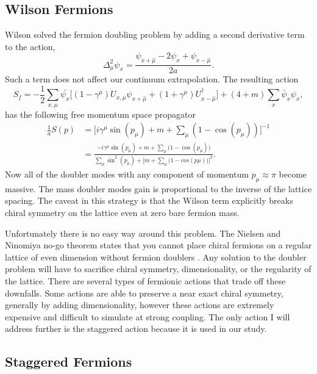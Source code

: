 \subsection{Wilson Fermions}
Wilson solved the fermion doubling problem by adding a second derivative term to the action,
\begin{equation}
  \Delta_\mu^2\psi_x=\frac{\psi_{x+\hat{\mu}}-2\psi_x+\psi_{x-\hat{\mu}}}{2a}.
\end{equation}
Such a term does not affect our continuum extrapolation.
The resulting action
\begin{equation}
  S_f=-\frac{1}{2}\sum_{x,\mu}\bar{\psi_x}\Big[(1-\gamma^\mu)U_{x,\mu}\psi_{x+\hat{\mu}}+(1+\gamma^\mu)U^\dagger_{x-\hat{\mu}}\Big]+(4+m)\sum_x\bar{\psi}_x\psi_x,
\end{equation}
has the following free momentum space propagator
\begin{equation}
  \begin{aligned}
    \frac{1}{a}S(p)&=\Big[i\gamma^\mu\sin(p_\mu)+m+\sum_\mu(1-\cos(p_\mu))\Big]^{-1}  \\
                   &=\frac{-i\gamma^\mu\sin(p_\mu)+m+\sum_\mu\big(1-\cos(p_\mu)\big)}{\sum_\mu\sin^2(p_\mu)+\Big[m+\sum_\mu\big(1-cos(p\mu)\big)\Big]^2}.
  \end{aligned}
\end{equation}
Now all of the doubler modes with any component of momentum $p_\mu\approx\pi$ become massive.
The mass doubler modes gain is proportional to the inverse of the lattice spacing.
The caveat in this strategy is that the Wilson term explicitly breaks chiral symmetry on the lattice even at zero bare fermion mass.

Unfortunately there is no easy way around this problem.
The Nielsen and Ninomiya no-go theorem states that you cannot place chiral fermions on a regular lattice of even dimension without fermion doublers \cite{Nielsen198120,Nielsen1981173,Nielsen1981219,kaplan:fermions}.
Any solution to the doubler problem will have to sacrifice chiral symmetry, dimensionality, or the regularity of the lattice.
There are several types of fermionic actions that trade off these downfalls.
Some actions are able to preserve a near exact chiral symmetry, generally by adding dimensionality, however these actions are extremely expensive and difficult to simulate at strong coupling.
The only action I will address further is the staggered action because it is used in our study.

\subsection{Staggered Fermions}

